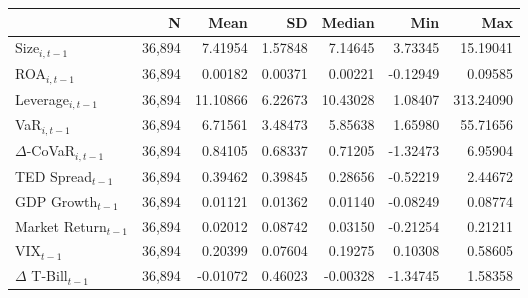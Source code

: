 \begin{tabular}{lrrrrrr}
  \hline
 & N & Mean & SD & Median & Min & Max \\ 
  \hline
Size$_{i,t-1}$ & 36,894 & 7.41954 & 1.57848 & 7.14645 & 3.73345 & 15.19041 \\ 
  ROA$_{i,t-1}$ & 36,894 & 0.00182 & 0.00371 & 0.00221 & -0.12949 & 0.09585 \\ 
  Leverage$_{i,t-1}$ & 36,894 & 11.10866 & 6.22673 & 10.43028 & 1.08407 & 313.24090 \\ 
  VaR$_{i,t-1}$ & 36,894 & 6.71561 & 3.48473 & 5.85638 & 1.65980 & 55.71656 \\ 
  $\Delta$-CoVaR$_{i,t-1}$ & 36,894 & 0.84105 & 0.68337 & 0.71205 & -1.32473 & 6.95904 \\ 
  TED Spread$_{t-1}$ & 36,894 & 0.39462 & 0.39845 & 0.28656 & -0.52219 & 2.44672 \\ 
  GDP Growth$_{t-1}$ & 36,894 & 0.01121 & 0.01362 & 0.01140 & -0.08249 & 0.08774 \\ 
  Market Return$_{t-1}$ & 36,894 & 0.02012 & 0.08742 & 0.03150 & -0.21254 & 0.21211 \\ 
  VIX$_{t-1}$ & 36,894 & 0.20399 & 0.07604 & 0.19275 & 0.10308 & 0.58605 \\ 
  $\Delta$ T-Bill$_{t-1}$ & 36,894 & -0.01072 & 0.46023 & -0.00328 & -1.34745 & 1.58358 \\ 
   \hline
\end{tabular}
